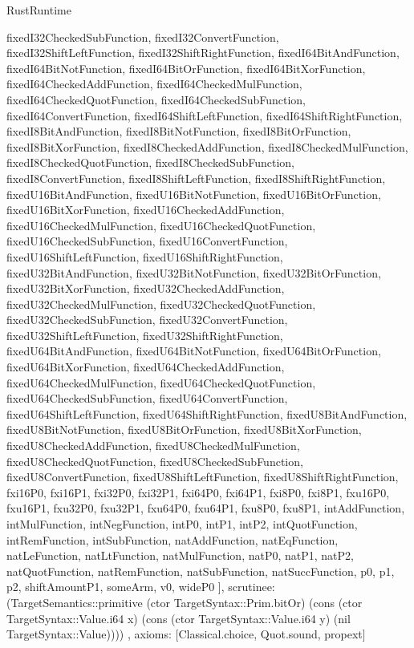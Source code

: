\begin{lexlean}{RustRuntime}
\begin{semanticmodule}
{{      fixedI32CheckedSubFunction,
      fixedI32ConvertFunction,
      fixedI32ShiftLeftFunction,
      fixedI32ShiftRightFunction,
      fixedI64BitAndFunction,
      fixedI64BitNotFunction,
      fixedI64BitOrFunction,
      fixedI64BitXorFunction,
      fixedI64CheckedAddFunction,
      fixedI64CheckedMulFunction,
      fixedI64CheckedQuotFunction,
      fixedI64CheckedSubFunction,
      fixedI64ConvertFunction,
      fixedI64ShiftLeftFunction,
      fixedI64ShiftRightFunction,
      fixedI8BitAndFunction,
      fixedI8BitNotFunction,
      fixedI8BitOrFunction,
      fixedI8BitXorFunction,
      fixedI8CheckedAddFunction,
      fixedI8CheckedMulFunction,
      fixedI8CheckedQuotFunction,
      fixedI8CheckedSubFunction,
      fixedI8ConvertFunction,
      fixedI8ShiftLeftFunction,
      fixedI8ShiftRightFunction,
      fixedU16BitAndFunction,
      fixedU16BitNotFunction,
      fixedU16BitOrFunction,
      fixedU16BitXorFunction,
      fixedU16CheckedAddFunction,
      fixedU16CheckedMulFunction,
      fixedU16CheckedQuotFunction,
      fixedU16CheckedSubFunction,
      fixedU16ConvertFunction,
      fixedU16ShiftLeftFunction,
      fixedU16ShiftRightFunction,
      fixedU32BitAndFunction,
      fixedU32BitNotFunction,
      fixedU32BitOrFunction,
      fixedU32BitXorFunction,
      fixedU32CheckedAddFunction,
      fixedU32CheckedMulFunction,
      fixedU32CheckedQuotFunction,
      fixedU32CheckedSubFunction,
      fixedU32ConvertFunction,
      fixedU32ShiftLeftFunction,
      fixedU32ShiftRightFunction,
      fixedU64BitAndFunction,
      fixedU64BitNotFunction,
      fixedU64BitOrFunction,
      fixedU64BitXorFunction,
      fixedU64CheckedAddFunction,
      fixedU64CheckedMulFunction,
      fixedU64CheckedQuotFunction,
      fixedU64CheckedSubFunction,
      fixedU64ConvertFunction,
      fixedU64ShiftLeftFunction,
      fixedU64ShiftRightFunction,
      fixedU8BitAndFunction,
      fixedU8BitNotFunction,
      fixedU8BitOrFunction,
      fixedU8BitXorFunction,
      fixedU8CheckedAddFunction,
      fixedU8CheckedMulFunction,
      fixedU8CheckedQuotFunction,
      fixedU8CheckedSubFunction,
      fixedU8ConvertFunction,
      fixedU8ShiftLeftFunction,
      fixedU8ShiftRightFunction,
      fxi16P0,
      fxi16P1,
      fxi32P0,
      fxi32P1,
      fxi64P0,
      fxi64P1,
      fxi8P0,
      fxi8P1,
      fxu16P0,
      fxu16P1,
      fxu32P0,
      fxu32P1,
      fxu64P0,
      fxu64P1,
      fxu8P0,
      fxu8P1,
      intAddFunction,
      intMulFunction,
      intNegFunction,
      intP0,
      intP1,
      intP2,
      intQuotFunction,
      intRemFunction,
      intSubFunction,
      natAddFunction,
      natEqFunction,
      natLeFunction,
      natLtFunction,
      natMulFunction,
      natP0,
      natP1,
      natP2,
      natQuotFunction,
      natRemFunction,
      natSubFunction,
      natSuccFunction,
      p0,
      p1,
      p2,
      shiftAmountP1,
      someArm,
      v0,
      wideP0
    ],
    scrutinee: (TargetSemantics::primitive (ctor TargetSyntax::Prim.bitOr) (cons (ctor TargetSyntax::Value.i64 x) (cons (ctor TargetSyntax::Value.i64 y) (nil TargetSyntax::Value))))
  },
  axioms: [Classical.choice, Quot.sound, propext]
}


\end{semanticmodule}
\end{lexlean}
